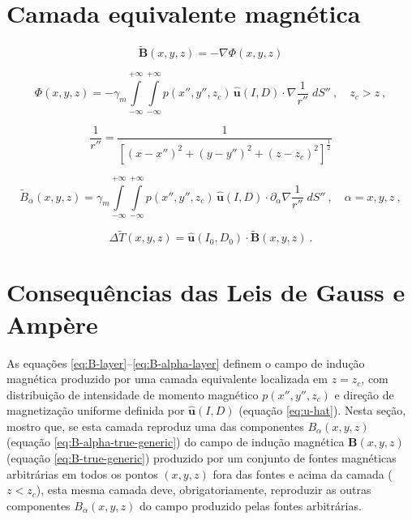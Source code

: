 \section{Camada equivalente magnética}
\label{sec:camada-equivalente}


\begin{equation}
\tilde{\mathbf{B}}(x, y, z) = - \nabla \Phi(x, y, z)
\label{eq:B-layer}
\end{equation}

\begin{equation}
\Phi(x, y, z) = - \gamma_{m} \int\limits_{-\infty}^{+\infty}\int\limits_{-\infty}^{+\infty} 
p(x'', y'', z_{c}) \, \hat{\mathbf{u}}(I, D) \cdot \nabla \frac{1}{r''} \; dS'' \: , \quad z_{c} > z \: ,
\label{eq:Phi-potential}
\end{equation}

\begin{equation}
\frac{1}{r''} = \frac{1}{\left[ (x - x'')^{2} + (y - y'')^{2} + (z - z_{c})^{2} \right]^{\frac{1}{2}}}
\label{eq:inv-r''}
\end{equation}

\begin{equation}
\tilde{B}_{\alpha}(x, y, z) = \gamma_{m} \int\limits_{-\infty}^{+\infty}\int\limits_{-\infty}^{+\infty} 
p(x'', y'', z_{c}) \, \hat{\mathbf{u}}(I, D) \cdot \partial_{\alpha} \nabla \frac{1}{r''} \; dS'' 
\: , \quad \alpha = x, y, z \: ,
\label{eq:B-alpha-layer}
\end{equation}

\begin{equation}
\Delta\tilde{T}(x, y, z) = \hat{\mathbf{u}}(I_{0}, D_{0}) \cdot \tilde{\mathbf{B}}(x, y, z) \: .
\label{eq:Delta-T-layer}
\end{equation}


\section{Consequências das Leis de Gauss e Amp{\`e}re}
\label{sec:Gauss-Ampere}

As equações \ref{eq:B-layer}--\ref{eq:B-alpha-layer} definem o campo de indução 
magnética produzido por uma camada equivalente localizada em $z = z_{c}$,
com distribuição de intensidade de momento magnético 
$p(x'', y'', z_{c})$ e direção de magnetização uniforme definida por 
$\hat{\mathbf{u}}(I, D)$ (equação \ref{eq:u-hat}). Nesta seção, mostro que, 
se esta camada reproduz uma das componentes $B_{\alpha}(x, y, z)$ (equação \ref{eq:B-alpha-true-generic})
do campo de indução magnética $\mathbf{B}(x, y, z)$ (equação \ref{eq:B-true-generic}) 
produzido por um conjunto de fontes magnéticas arbitrárias em todos os pontos 
$(x, y, z)$ fora das fontes e acima da camada ($z < z_{c}$), esta mesma camada deve, 
obrigatoriamente, reproduzir as outras componentes $B_{\alpha}(x, y, z)$ do campo 
produzido pelas fontes arbitrárias.

